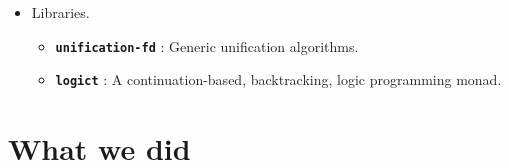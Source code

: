 \documentclass[hideothersubsections, t, aspectratio=1610]{beamer}
\providecommand\codeLibrary[1]{\texttt{\bfseries #1}}
\begin{document}
\begin{frame}
\begin{itemize}
\item Libraries.
\begin{itemize}
\item \codeLibrary{unification-fd} : Generic unification algorithms. 

\item \codeLibrary{logict} : A continuation-based, backtracking, logic programming monad.

\end{itemize}

\end{itemize}

\end{frame}



\section{What we did}
\end{document}
